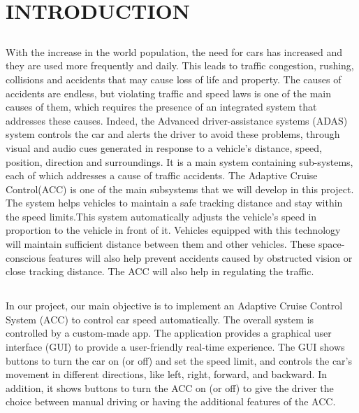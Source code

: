 \documentclass[12pt,a4paper]{report}
\begin{document}
\chapter{INTRODUCTION}
\section{\fontsize{12}{12}\selectfont{Problem Statement and Purpose}}
With the increase in the world population, the need for cars has increased and they are used more frequently and daily. This leads to traffic congestion, rushing, collisions and accidents that may cause loss of life and property. The causes of accidents are endless, but violating traffic and speed laws is one of the main causes of them, which requires the presence of an integrated system that addresses these causes. Indeed, the Advanced driver-assistance systems (ADAS) system controls the car and alerts the driver to avoid these problems, through visual and audio cues generated in response to a vehicle's distance, speed, position, direction and surroundings. It is a main system containing sub-systems, each of which addresses a cause of traffic accidents. The Adaptive Cruise Control(ACC) is one of the main subsystems that we will develop in this project. The system helps vehicles to maintain a safe tracking distance and stay within the speed limits.This system automatically adjusts the vehicle's speed in proportion to the vehicle in front of it. Vehicles equipped with this technology will maintain sufficient distance between them and other vehicles. These space-conscious features will also help prevent accidents caused by obstructed vision or close tracking distance. The ACC will also help in regulating the traffic.

\section{\fontsize{12}{12}\selectfont{Project and Design Objectives}}
In our project, our main objective is to implement an Adaptive Cruise Control System (ACC) to control car speed automatically. The overall system is controlled by a custom-made app. The application  provides a graphical user interface (GUI) to provide a user-friendly real-time experience. The GUI shows buttons to turn the car on (or off) and set the speed limit, and controls the car's movement in different directions, like left, right, forward, and backward. In addition, it shows buttons to turn the ACC on (or off) to give the driver the choice between manual driving or having the additional features of the ACC.
\end{document}
